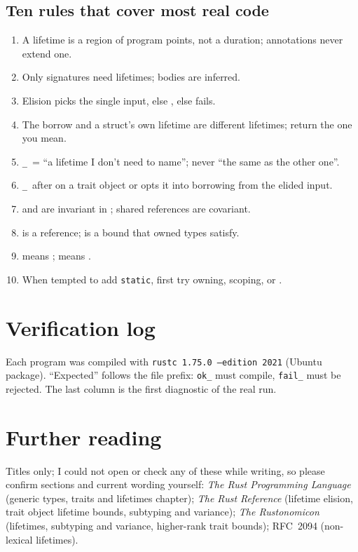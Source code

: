 \documentclass[10.5pt,a4paper]{article}
\newcommand{\st}{\texorpdfstring{\texttt{\textquotesingle static}}{'static}}
\newcommand{\us}{\texorpdfstring{\texttt{\textquotesingle\_}}{'\_}}
\let\origsubsection\subsection
\renewcommand{\subsection}{\needspace{7\baselineskip}\origsubsection}
\let\origsection\section
\renewcommand{\section}{\needspace{9\baselineskip}\origsection}
\begin{document}
\subsection*{Ten rules that cover most real code}
\begin{enumerate}
\item A lifetime is a region of program points, not a duration; annotations never extend one.
\item Only signatures need lifetimes; bodies are inferred.
\item Elision picks the single input, else , else fails.
\item The  borrow and a struct's own lifetime are different lifetimes; return the one you mean.
\item \us\ = ``a lifetime I don't need to name''; never ``the same as the other one''.
\item \us\ after \rs{+} on a trait object or  opts it into borrowing from the elided input.
\item {} and  are invariant in ; shared references are covariant.
\item {} is a reference;  is a bound that owned types satisfy.
\item {} means ;  means .
\item When tempted to add \st, first try owning, scoping, or .
\end{enumerate}

\appendix
\clearpage
\section{Verification log}

Each program was compiled with \texttt{rustc 1.75.0 --edition 2021} (Ubuntu package). ``Expected'' follows the file prefix:
\texttt{ok\_} must compile, \texttt{fail\_} must be rejected. The last column is the first diagnostic of the real run.



\section{Further reading}

Titles only; I could not open or check any of these while writing, so please confirm sections and current wording yourself:
\emph{The Rust Programming Language} (generic types, traits and lifetimes chapter); \emph{The Rust Reference}
(lifetime elision, trait object lifetime bounds, subtyping and variance); \emph{The Rustonomicon} (lifetimes, subtyping and variance,
higher-rank trait bounds); RFC~2094 (non-lexical lifetimes).
\end{document}
